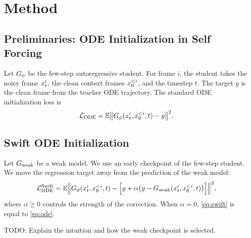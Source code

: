 \section{Method}
\label{sec:method}

\subsection{Preliminaries: ODE Initialization in Self Forcing}
\label{sec:method:ode}

Let $G_{\phi}$ be the few-step autoregressive student. For frame $i$, the student
takes the noisy frame $x_t^{i}$, the clean context frames $x_0^{<i}$, and the
timestep $t$. The target $y$ is the clean frame from the teacher ODE
trajectory. The standard ODE initialization loss is
\begin{equation}
  \mathcal{L}_{\text{ODE}} = \mathbb{E} \big\| G_{\phi}(x_t^{i}, x_0^{<i}, t) - y \big\|^2 .
  \label{eq:ode}
\end{equation}

\subsection{Swift ODE Initialization}
\label{sec:method:swift}

Let $G_{\text{weak}}$ be a weak model. We use an early checkpoint of the few-step
student. We move the regression target away from the prediction of the weak
model:
\begin{equation}
  \mathcal{L}_{\text{ODE}}^{\text{Swift}} = \mathbb{E} \Big\| G_{\phi}(x_t^{i}, x_0^{<i}, t)
    - \Big[ y + \alpha \big( y - G_{\text{weak}}(x_t^{i}, x_0^{<i}, t) \big) \Big] \Big\|^2 ,
  \label{eq:swift}
\end{equation}
where $\alpha \ge 0$ controls the strength of the correction. When
$\alpha = 0$, \cref{eq:swift} is equal to \cref{eq:ode}.

TODO: Explain the intuition and how the weak checkpoint is selected.

